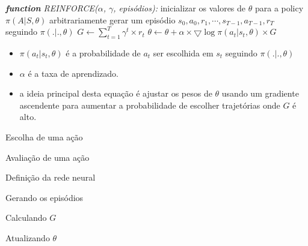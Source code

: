 \documentclass{beamer}
\begin{document}
\begin{frame}
	\begin{algorithmic} 
		\STATE \emph{\textbf{function} REINFORCE($\alpha$, $\gamma$, episódios):}
		\STATE inicializar os valores de $\theta$ para a policy $\pi(A|S,\theta)$ arbitrariamente
		\STATE gerar um episódio ${s_{0},a_{0},r_{1},\cdots,s_{T-1},a_{T-1},r_{T}}$ seguindo $\pi(.|.,\theta)$
		\STATE $G \leftarrow \sum_{t=1}^{T} \gamma^{t} \times r_{t}$
		\STATE \HiLi $\theta \leftarrow \theta + \alpha \times \bigtriangledown \log \pi(a_{t}|s_{t}, \theta) \times G$
		\ENDFOR
		\ENDFOR
	\end{algorithmic}
	
	\begin{itemize}
		\item $\pi(a_{t}|s_{t}, \theta)$ é a probabilidade de $a_{t}$ ser escolhida em $s_{t}$ seguindo $\pi(.|.,\theta)$
		\item $\alpha$ é a taxa de aprendizado.
		\item a ideia principal desta equação é ajustar os pesos de $\theta$ usando um gradiente ascendente para aumentar a probabilidade de escolher trajetórias onde $G$ é alto.  
	\end{itemize}
\end{frame}

\begin{frame}{Escolha de uma ação}
	
\end{frame}

\begin{frame}{Avaliação de uma ação}
	
\end{frame}

\begin{frame}{Definição da rede neural}
	
\end{frame}

\begin{frame}{Gerando os episódios}
	\small
	
\end{frame}

\begin{frame}{Calculando $G$}
	
\end{frame}

\begin{frame}{Atualizando $\theta$}
	\scriptsize
	
\end{frame}
\end{document}
